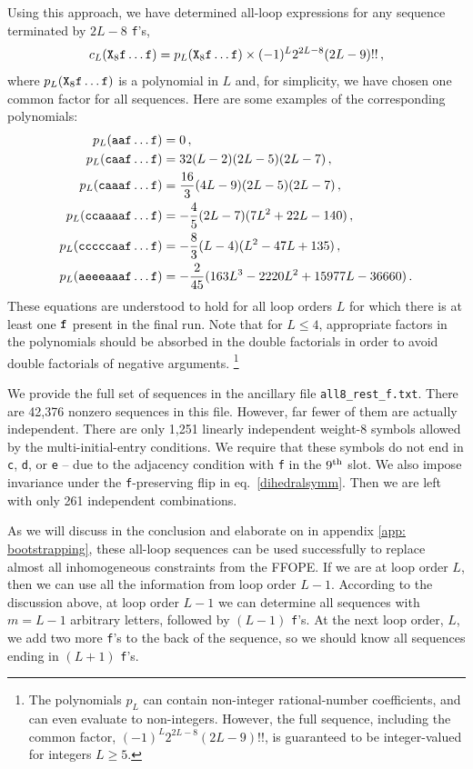 \documentclass[12pt]{article}
\begin{document}
Using this approach, we have determined all-loop expressions for any sequence terminated by $2L-8$ {\tt f}'s,
%
\begin{equation}
    c_L({\tt X}_8 {\tt f\ldots f}) 
   = p_L({\tt X}_8  {\tt f\ldots f}) \times (-1)^L 2^{2 L - 8} (2 L - 9)!!\,,
\end{equation}
%
where $p_L({\tt X}_8 {\tt f\ldots f})$ is a polynomial in $L$ and, for simplicity, we have chosen one common factor for all sequences.
Here are some examples of the corresponding polynomials:
%
\begin{align}
p_L({\tt aaf\ldots f}) &= 0\,,  \label{eq:aafXf}\\
p_L({\tt caaf\ldots f}) &= 32(L-2)(2L-5)(2L-7) \,, \label{eq:caafXf}\\
p_L({\tt caaaf\ldots f}) &= \frac{16}{3}(4L-9)(2L-5)(2L-7) \,, \label{eq:caaafXf}\\
p_L({\tt ccaaaaf\ldots f}) &= -\frac{4}{5}(2L-7)(7L^2+22L-140) \,,\\
p_L({\tt cccccaaf\ldots f}) &= -\frac{8}{3}(L-4)(L^2-47L+135) \,,\\
p_L({\tt aeeeaaaf\ldots f}) &= -\frac{2}{45}(163 L^3 - 2220 L^2 + 15977 L - 36660) \,.
\end{align}
%
These equations are understood to hold for all loop orders $L$ for which there is at least one $\tt f$ present in the final run.
Note that for $L\leq4$, appropriate factors in the polynomials should be absorbed in the double factorials in order to avoid double factorials of negative arguments.%
\footnote{The polynomials $p_L$ can contain non-integer rational-number coefficients, and can even evaluate to non-integers.  However, the full sequence, including the common factor, $(-1)^L 2^{2 L - 8} (2 L - 9)!!$, is guaranteed to be integer-valued for integers $L\geq5$.}

We provide the full set of sequences in the ancillary file \texttt{all8\_rest\_f.txt}.  
There are 42,376 nonzero sequences in this file.  However, far fewer of them are actually independent.  There are only 1,251 linearly independent weight-8 symbols allowed by the multi-initial-entry conditions.  We require that these symbols do not end in 
{\tt c}, {\tt d}, or {\tt e} -- due to the adjacency condition with {\tt f} in the $9^{\rm th}$ slot.  We also impose invariance under the {\tt f}-preserving flip in eq.~\eqref{dihedralsymm}. Then we are left with only 261 independent combinations.


As we will discuss in the conclusion and elaborate on in appendix \ref{app: bootstrapping}, these all-loop sequences can be used successfully to replace almost all inhomogeneous constraints from the FFOPE.
If we are at loop order $L$, then we can use all the information from loop order $L-1$.  According to the discussion above, at loop order $L-1$ we can determine all sequences with $m=L-1$ arbitrary letters, followed by $(L-1)$ {\tt f}'s.  At the next loop order, $L$, we add two more {\tt f}'s to the back of the sequence, so we should know all sequences ending in $(L+1)$ {\tt f}'s.
\end{document}
